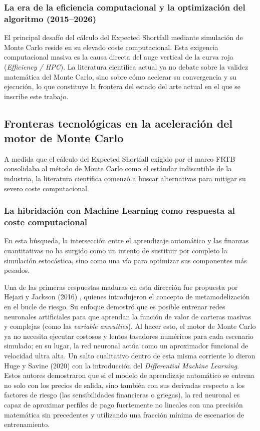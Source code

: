 \documentclass[11pt]{article}
\begin{document}
\subsubsection{La era de la eficiencia computacional y la optimización del algoritmo (2015--2026)}

El principal desafío del cálculo del Expected Shortfall mediante simulación de Monte Carlo reside en su elevado coste computacional. Esta exigencia computacional masiva es la causa directa del auge vertical de la curva roja (\textit{Efficiency / HPC}). La literatura científica actual ya no debate sobre la validez matemática del Monte Carlo, sino sobre cómo acelerar su convergencia y su ejecución, lo que constituye la frontera del estado del arte actual en el que se inscribe este trabajo.

\subsection{Fronteras tecnológicas en la aceleración del motor de Monte Carlo}

A medida que el cálculo del Expected Shortfall exigido por el marco FRTB consolidaba al método de Monte Carlo como el estándar indiscutible de la industria, la literatura científica comenzó a buscar alternativas para mitigar su severo coste computacional.

\subsubsection{La hibridación con Machine Learning como respuesta al coste computacional}

En esta búsqueda, la intersección entre el aprendizaje automático y las finanzas cuantitativas no ha surgido como un intento de sustituir por completo la simulación estocástica, sino como una vía para optimizar sus componentes más pesados.

Una de las primeras respuestas maduras en esta dirección fue propuesta por Hejazi y Jackson (2016) \cite{hejazi2016neural}, quienes introdujeron el concepto de metamodelización en el bucle de riesgo. Su enfoque demostró que es posible entrenar redes neuronales artificiales para que aprendan la función de valor de carteras masivas y complejas (como las \textit{variable annuities}). Al hacer esto, el motor de Monte Carlo ya no necesita ejecutar costosos y lentos tasadores numéricos para cada escenario simulado; en su lugar, la red neuronal actúa como un aproximador funcional de velocidad ultra alta. Un salto cualitativo dentro de esta misma corriente lo dieron Huge y Savine (2020) \cite{huge2020differential} con la introducción del \textit{Differential Machine Learning}. Estos autores demostraron que si el modelo de aprendizaje automático se entrena no solo con los precios de salida, sino también con sus derivadas respecto a los factores de riesgo (las sensibilidades financieras o griegas), la red neuronal es capaz de aproximar perfiles de pago fuertemente no lineales con una precisión matemática sin precedentes y utilizando una fracción mínima de escenarios de entrenamiento.
\end{document}
